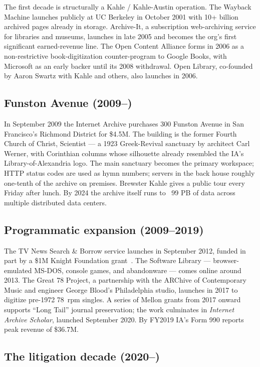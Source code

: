 \documentclass[10pt,letterpaper,twocolumn]{article}
\begin{document}
The first decade is structurally a Kahle / Kahle-Austin operation. The Wayback Machine launches publicly at UC Berkeley in October 2001 with 10+ billion archived pages already in storage. Archive-It, a subscription web-archiving service for libraries and museums, launches in late 2005 and becomes the org's first significant earned-revenue line. The Open Content Alliance forms in 2006 as a non-restrictive book-digitization counter-program to Google Books, with Microsoft as an early backer until its 2008 withdrawal. Open Library, co-founded by Aaron Swartz with Kahle and others, also launches in 2006.

\subsection{Funston Avenue (2009--)}

In September 2009 the Internet Archive purchases 300 Funston Avenue in San Francisco's Richmond District for \$4.5M. The building is the former Fourth Church of Christ, Scientist --- a 1923 Greek-Revival sanctuary by architect Carl Werner, with Corinthian columns whose silhouette already resembled the IA's Library-of-Alexandria logo. The main sanctuary becomes the primary workspace; HTTP status codes are used as hymn numbers; servers in the back house roughly one-tenth of the archive on premises. Brewster Kahle gives a public tour every Friday after lunch. By 2024 the archive itself runs to ~99 PB of data across multiple distributed data centers.

\subsection{Programmatic expansion (2009--2019)}

The TV News Search \& Borrow service launches in September 2012, funded in part by a \$1M Knight Foundation grant~\citep{knight2013tvnews}. The Software Library --- browser-emulated MS-DOS, console games, and abandonware --- comes online around 2013. The Great 78 Project, a partnership with the ARChive of Contemporary Music and engineer George Blood's Philadelphia studio, launches in 2017 to digitize pre-1972 78~rpm singles. A series of Mellon grants from 2017 onward supports ``Long Tail'' journal preservation; the work culminates in \emph{Internet Archive Scholar}, launched September 2020. By FY2019 IA's Form 990 reports peak revenue of \$36.7M.

\subsection{The litigation decade (2020--)}
\end{document}
